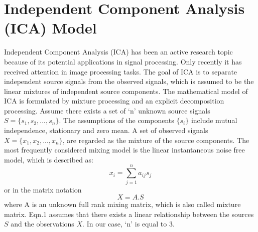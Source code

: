 % 
% 


\section{Independent Component Analysis (ICA) Model}
\label{sec:format}

Independent Component Analysis (ICA) has been an active research topic 
because of its potential applications in signal processing. Only recently 
it has received attention in image processing tasks.
The goal of ICA is to separate independent 
source signals from the observed signals, which is assumed 
to be the linear mixtures of independent source components. 
The mathematical model of ICA is formulated by 
mixture processing and an explicit decomposition processing.  
Assume there exists a set of `n' unknown source signals 
$S=\{s_1, s_2,..., s_n \}$. The assumptions of the components 
$\{s_i\}$  include mutual independence, stationary and zero mean. 
A set of observed signals $X=\{x_1,x_2,...,x_n\}$, are regarded as the mixture of the source 
components. The most frequently considered 
mixing model is the linear instantaneous noise free model,
which is described as: 
\begin{equation}
x_i=\sum_{j=1}^{n}a_{ij}s_j 
\end{equation}or in the matrix notation
\begin{equation}
X=A.S  
\end{equation}where A is an unknown full rank mixing matrix, which is 
also called mixture matrix. Eqn.1 assumes that there exists a 
linear relationship between the sources $S$ and the observations 
$X$. In our case, `n' is equal to 3. 

